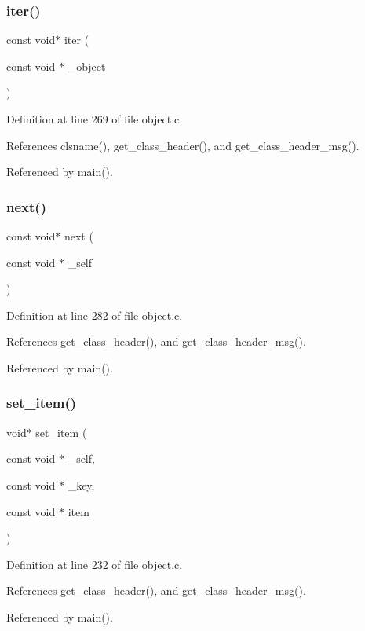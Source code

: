 \subsubsection{\texorpdfstring{iter()}{iter()}}
{\footnotesize\ttfamily const void$\ast$ iter (\begin{DoxyParamCaption}\item[{const void $\ast$}]{\+\_\+object }\end{DoxyParamCaption})}



Definition at line 269 of file object.\+c.



References clsname(), get\+\_\+class\+\_\+header(), and get\+\_\+class\+\_\+header\+\_\+msg().



Referenced by main().

\mbox{\label{group__collection_gaecc46e74b03a83ca8a8023cc7264489c}} 
\subsubsection{\texorpdfstring{next()}{next()}}
{\footnotesize\ttfamily const void$\ast$ next (\begin{DoxyParamCaption}\item[{const void $\ast$}]{\+\_\+self }\end{DoxyParamCaption})}



Definition at line 282 of file object.\+c.



References get\+\_\+class\+\_\+header(), and get\+\_\+class\+\_\+header\+\_\+msg().



Referenced by main().

\mbox{\label{group__collection_ga6b0c20cd48a1ab79321a018d29037161}} 
\subsubsection{\texorpdfstring{set\+\_\+item()}{set\_item()}}
{\footnotesize\ttfamily void$\ast$ set\+\_\+item (\begin{DoxyParamCaption}\item[{const void $\ast$}]{\+\_\+self,  }\item[{const void $\ast$}]{\+\_\+key,  }\item[{const void $\ast$}]{item }\end{DoxyParamCaption})}



Definition at line 232 of file object.\+c.



References get\+\_\+class\+\_\+header(), and get\+\_\+class\+\_\+header\+\_\+msg().



Referenced by main().

